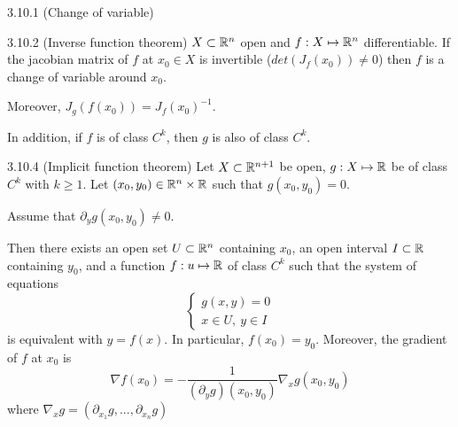 \begin{definition}{3.10.1 (Change of variable)}

\end{definition}

\begin{theorem}{3.10.2 (Inverse function theorem)}
    $X \subset \mathbb{R}^n$ open and $f: X \mapsto \mathbb{R}^n$ differentiable.
    If the jacobian matrix of $f$ at $x_0 \in X$ is invertible ($det(J_f(x_0)) \ne 0$) then $f$ is a change of variable around $x_0$.

    Moreover, $J_g(f(x_0)) = J_f(x_0)^{-1}$.

    In addition, if $f$ is of class $C^k$, then $g$ is also of class $C^k$.
\end{theorem}

\begin{theorem}{3.10.4 (Implicit function theorem)}
    Let $X \subset \mathbb{R}^{n + 1}$ be open, $g: X \mapsto \mathbb{R}$ be of class $C^k$ with $k \ge 1$. Let $(x_0, y_0) \in \mathbb{R}^n \times \mathbb{R}$
    such that $g(x_0, y_0) = 0$.

    Assume that $\partial_y g(x_0, y_0) \ne 0$.

    Then there exists an open set $U \subset \mathbb{R}^n$ containing $x_0$, an open interval $I \subset \mathbb{R}$ containing $y_0$, and a function
    $f: u \mapsto \mathbb{R}$ of class $C^k$ such that the system of equations
    \[ \begin{cases}
            g(x,y) = 0 \\
            x \in U,\ y \in I
        \end{cases} \]
    is equivalent with $y = f(x)$. In particular, $f(x_0) = y_0$. Moreover, the gradient of $f$ at $x_0$ is
    \[ \nabla f(x_0) = - \frac{1}{(\partial_y g)(x_0, y_0)} \nabla_x g(x_0, y_0) \]
    where $\nabla_x g = (\partial_{x_1} g, ..., \partial_{x_n} g)$
\end{theorem}
